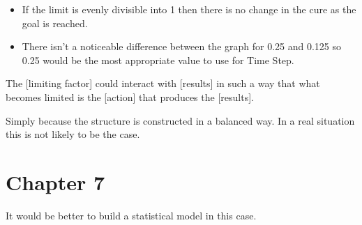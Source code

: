 \documentclass[]{memoir}
\begin{document}

\begin{itemize}
\itemsep1pt\parskip0pt
\item
  If the limit is evenly divisible into 1 then there is no change in the
  cure as the goal is reached.
\item
  There isn't a noticeable difference between the graph for 0.25 and
  0.125 so 0.25 would be the most appropriate value to use for Time
  Step.
\end{itemize}


The {[}limiting factor{]} could interact with {[}results{]} in such a
way that what becomes limited is the {[}action{]} that produces the
{[}results{]}.


Simply because the structure is constructed in a balanced way. In a real
situation this is not likely to be the case.

\section{Chapter 7}


It would be better to build a statistical model in this case.

\end{document}

